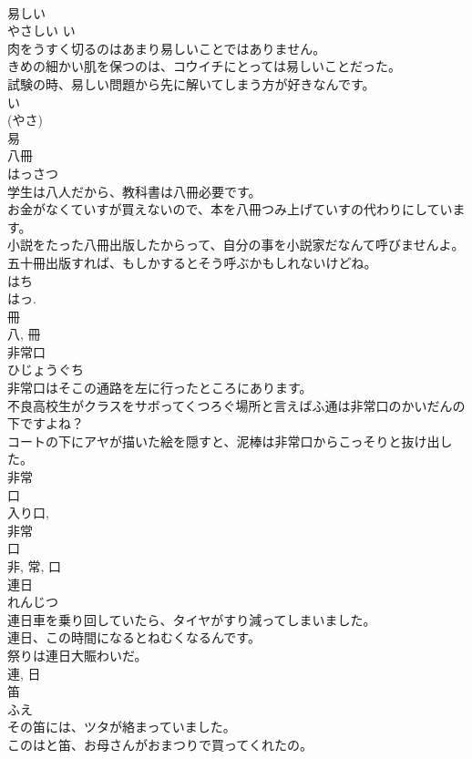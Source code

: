 \documentclass[8pt]{extreport}
\begin{document}
\begin{CJK}{UTF8}{min}
\\	易しい	
\\	やさしい	い 
\\	肉をうすく切るのはあまり易しいことではありません。	
\\	きめの細かい肌を保つのは、コウイチにとっては易しいことだった。	
\\	試験の時、易しい問題から先に解いてしまう方が好きなんです。	
\\	い 
\\	(やさ) 
\\	易	
\\	八冊	
\\	はっさつ	
\\	学生は八人だから、教科書は八冊必要です。	
\\	お金がなくていすが買えないので、本を八冊つみ上げていすの代わりにしています。	
\\	小説をたった八冊出版したからって、自分の事を小説家だなんて呼びませんよ。五十冊出版すれば、もしかするとそう呼ぶかもしれないけどね。	
\\	はち 
\\	はっ. 
\\	冊 
\\	八, 冊	
\\	非常口	
\\	ひじょうぐち	
\\	非常口はそこの通路を左に行ったところにあります。	
\\	不良高校生がクラスをサボってくつろぐ場所と言えばふ通は非常口のかいだんの下ですよね？	
\\	コートの下にアヤが描いた絵を隠すと、泥棒は非常口からこっそりと抜け出した。	
\\	非常 
\\	口 
\\	入り口, 
\\	非常 
\\	口 
\\	非, 常, 口	
\\	連日	
\\	れんじつ	
\\	連日車を乗り回していたら、タイヤがすり減ってしまいました。	
\\	連日、この時間になるとねむくなるんです。	
\\	祭りは連日大賑わいだ。	
\\	連, 日	
\\	笛	
\\	ふえ	
\\	その笛には、ツタが絡まっていました。	
\\	このはと笛、お母さんがおまつりで買ってくれたの。	

\end{CJK}
\end{document}
